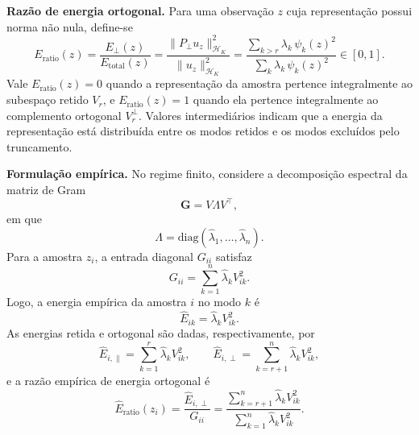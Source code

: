 \textbf{Razão de energia ortogonal.} Para uma observação $z$ cuja representação possui norma não nula, define-se
\begin{equation}\label{eq:e_ratio}
    E_{\mathrm{ratio}}(z)
    =
    \frac{
        E_\perp(z)
    }{
        E_{\mathrm{total}}(z)
    }
    =
    \frac{
        \|P_\perp u_z\|_{\mathcal{H}_K}^2
    }{
        \|u_z\|_{\mathcal{H}_K}^2
    }
    =
    \frac{
        \sum_{k>r}
        \lambda_k\,\psi_k(z)^2
    }{
        \sum_k
        \lambda_k\,\psi_k(z)^2
    }
    \in [0,1].
\end{equation}
Vale $E_{\mathrm{ratio}}(z)=0$ quando a representação da amostra pertence integralmente ao subespaço retido $V_r$, e $E_{\mathrm{ratio}}(z)=1$ quando ela pertence integralmente ao complemento ortogonal $V_r^\perp$. Valores intermediários indicam que a energia da representação está distribuída entre os modos retidos e os modos excluídos pelo truncamento.
 
\textbf{Formulação empírica.} No regime finito, considere a decomposição espectral da matriz de Gram
\begin{equation}\label{eq:empirical_eigendecomposition}
    \mathbf{G}
    =
    V\Lambda V^\top,
\end{equation}
em que
\begin{equation*}
    \Lambda
    =
    \mathrm{diag}
    \left(
        \widehat{\lambda}_1,
        \dots,
        \widehat{\lambda}_n
    \right).
\end{equation*}
Para a amostra $z_i$, a entrada diagonal $G_{ii}$ satisfaz
\begin{equation}\label{eq:empirical_total_energy}
    G_{ii}
    =
    \sum_{k=1}^{n}
    \widehat{\lambda}_k V_{ik}^2.
\end{equation}
Logo, a energia empírica da amostra $i$ no modo $k$ é
\begin{equation}\label{eq:empirical_mode_energy}
    \widehat{E}_{ik}
    =
    \widehat{\lambda}_k V_{ik}^2.
\end{equation}
As energias retida e ortogonal são dadas, respectivamente, por
\begin{equation}\label{eq:empirical_energies}
    \widehat{E}_{i,\parallel}
    =
    \sum_{k=1}^{r}
    \widehat{\lambda}_k V_{ik}^2,
    \qquad
    \widehat{E}_{i,\perp}
    =
    \sum_{k=r+1}^{n}
    \widehat{\lambda}_k V_{ik}^2,
\end{equation}
e a razão empírica de energia ortogonal é
\begin{equation}\label{eq:empirical_e_ratio}
    \widehat{E}_{\mathrm{ratio}}(z_i)
    =
    \frac{
        \widehat{E}_{i,\perp}
    }{
        G_{ii}
    }
    =
    \frac{
        \sum_{k=r+1}^{n}
        \widehat{\lambda}_k V_{ik}^2
    }{
        \sum_{k=1}^{n}
        \widehat{\lambda}_k V_{ik}^2
    }.
\end{equation}
 
